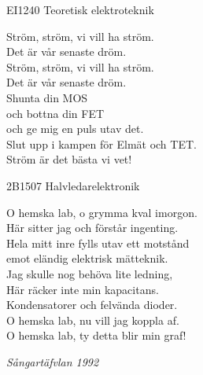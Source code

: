 \documentclass[a6paper,10pt]{article}
\begin{document}
\setlength{\oddsidemargin}{-0.47in}
\noindent
\begin{center}
\footnotesize EI1240 Teoretisk elektroteknik\\
\end{center}
Ström, ström, vi vill ha ström. \\
Det är vår senaste dröm. \\
Ström, ström, vi vill ha ström. \\
Det är vår senaste dröm. 
\vspace{5pt} \\
Shunta din MOS \\
och bottna din FET \\
och ge mig en puls utav det. \\
Slut upp i kampen för Elmät och TET. \\
Ström är det bästa vi vet! 
\vspace{20pt} 
\begin{center}
\footnotesize2B1507 Halvledarelektronik\\
\end{center}
O hemska lab, o grymma kval imorgon. \\
Här sitter jag och förstår ingenting. \\
Hela mitt inre fylls utav ett motstånd \\
emot eländig elektrisk mätteknik. 
\vspace{5pt} \\
Jag skulle nog behöva lite ledning, \\
Här räcker inte min kapacitans. 
\vspace{5pt} \\
Kondensatorer och felvända dioder. \\
O hemska lab, nu vill jag koppla af. \\
O hemska lab, ty detta blir min graf! 
\begin{flushright}
\textit{Sångartäfvlan 1992}
\end{flushright}

\newpage
\setlength{\oddsidemargin}{-0.37in}
\noindent
\end{document}
